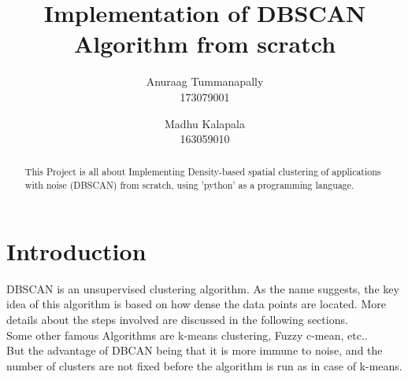 \documentclass[conference]{IEEEtran}
\numberwithin{equation}{section}
\begin{document}
\title{Implementation of DBSCAN Algorithm from scratch}
\author{Anuraag Tummanapally\\173079001 \and Madhu Kalapala\\163059010}
\maketitle


\begin{abstract}
This Project is all about Implementing Density-based spatial clustering of applications with noise (DBSCAN) from scratch, using 'python' as a programming language.
\end{abstract}

\section{Introduction}
DBSCAN is an unsupervised clustering algorithm. As the name suggests, the key idea of this algorithm is based on how dense the data points are located. More details about the steps involved are discussed in the following sections.\\

Some other famous Algorithms are k-means clustering, Fuzzy c-mean, etc..\\

But the advantage of DBCAN being that it is more immune to noise, and the number of clusters are not fixed before the algorithm is run as in case of k-means.
\end{document}
